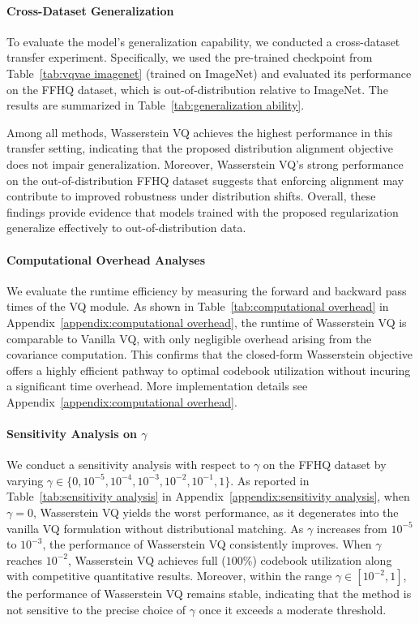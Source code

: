 \paragraph{Cross-Dataset Generalization}
To evaluate the model’s generalization capability, we conducted a cross-dataset transfer experiment. Specifically, we used the pre-trained checkpoint from Table~\ref{tab:vqvae imagenet} (trained on ImageNet) and evaluated its performance on the FFHQ dataset, which is out-of-distribution relative to ImageNet. The results are summarized in Table~\ref{tab:generalization ability}.

Among all methods, Wasserstein VQ achieves the highest performance in this transfer setting, indicating that the proposed distribution alignment objective does not impair generalization. Moreover, Wasserstein VQ’s strong performance on the out-of-distribution FFHQ dataset suggests that enforcing alignment may contribute to improved robustness under distribution shifts. Overall, these findings provide evidence that models trained with the proposed regularization generalize effectively to out-of-distribution data.


\paragraph{Computational Overhead Analyses} We evaluate the runtime efficiency by measuring the forward and backward pass times of the VQ module. As shown in Table~\ref{tab:computational overhead} in Appendix~\ref{appendix:computational overhead}, the runtime of Wasserstein VQ is comparable to Vanilla VQ, with only negligible overhead arising from the covariance computation.  This confirms that the closed-form Wasserstein objective offers a highly efficient pathway to optimal codebook utilization without incuring a significant time overhead. More implementation details see Appendix~\ref{appendix:computational overhead}.

\paragraph{Sensitivity Analysis on $\gamma$} 
We conduct a sensitivity analysis with respect to $\gamma$ on the FFHQ dataset by varying $\gamma \in \{0, 10^{-5}, 10^{-4}, 10^{-3}, 10^{-2}, 10^{-1}, 1\}$. As reported in Table~\ref{tab:sensitivity analysis} in Appendix~\ref{appendix:sensitivity analysis}, when $\gamma = 0$, Wasserstein VQ yields the worst performance, as it degenerates into the vanilla VQ formulation without distributional matching. As $\gamma$ increases from $10^{-5}$ to $10^{-3}$, the performance of Wasserstein VQ consistently improves. When $\gamma$ reaches $10^{-2}$, Wasserstein VQ achieves full ($100\%$) codebook utilization along with competitive quantitative results. Moreover, within the range $\gamma \in [10^{-2}, 1]$, the performance of Wasserstein VQ remains stable, indicating that the method is not sensitive to the precise choice of $\gamma$ once it exceeds a moderate threshold.



